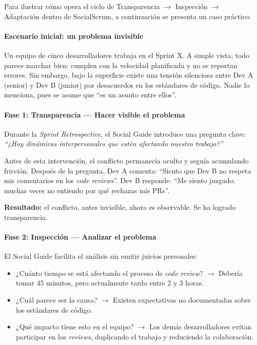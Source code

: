 Para ilustrar cómo opera el ciclo de Transparencia $\rightarrow$ Inspección $\rightarrow$ Adaptación dentro de SocialScrum, a continuación se presenta un caso práctico:

\paragraph{Escenario inicial: un problema invisible}

Un equipo de cinco desarrolladores trabaja en el Sprint X. A simple vista, todo parece marchar bien: cumplen con la velocidad planificada y no se reportan errores. Sin embargo, bajo la superficie existe una tensión silenciosa entre Dev A (senior) y Dev B (junior) por desacuerdos en los estándares de código. Nadie lo menciona, pues se asume que ``es un asunto entre ellos''.

\paragraph{Fase 1: Transparencia — Hacer visible el problema}

Durante la \textit{Sprint Retrospective}, el Social Guide introduce una pregunta clave:
\textit{``¿Hay dinámicas interpersonales que estén afectando nuestro trabajo?''}

Antes de esta intervención, el conflicto permanecía oculto y seguía acumulando fricción.
Después de la pregunta, Dev A comenta: ``Siento que Dev B no respeta mis comentarios en los \textit{code reviews}''.
Dev B responde: ``Me siento juzgado; muchas veces no entiendo por qué rechazas mis PRs''.

\textbf{Resultado:} el conflicto, antes invisible, ahora es observable. Se ha logrado transparencia.

\paragraph{Fase 2: Inspección — Analizar el problema}

El Social Guide facilita el análisis sin emitir juicios personales:

\begin{itemize}
    \item ¿Cuánto tiempo se está afectando el proceso de \textit{code review}? $\rightarrow$ Debería tomar 45 minutos, pero actualmente tarda entre 2 y 3 horas.
    \item ¿Cuál parece ser la causa? $\rightarrow$ Existen expectativas no documentadas sobre los estándares de código.
    \item ¿Qué impacto tiene esto en el equipo? $\rightarrow$ Los demás desarrolladores evitan participar en los \textit{reviews}, duplicando el trabajo y reduciendo la colaboración.
\end{itemize}

